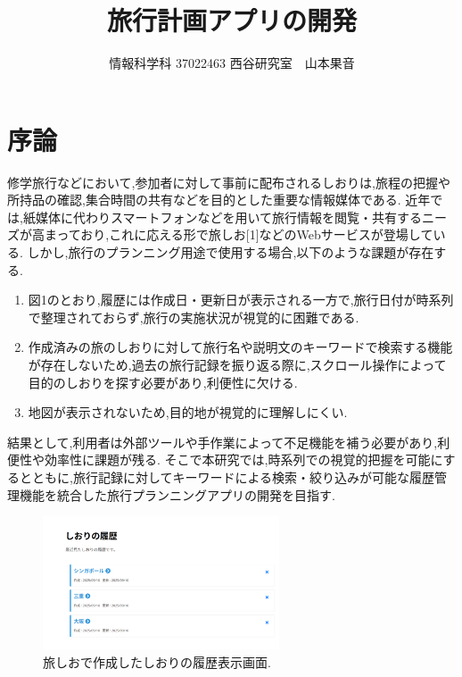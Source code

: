\documentclass[a4j,twocolumn]{jsarticle}
\begin{document}
  \title{旅行計画アプリの開発}
  \author{情報科学科 \hspace{5mm} 37022463 \hspace{5mm} 西谷研究室　山本果音}
  \date{}

  \maketitle


\section{序論}
\label{sec:org906f131}
修学旅行などにおいて,参加者に対して事前に配布されるしおりは,旅程の把握や所持品の確認,集合時間の共有などを目的とした重要な情報媒体である.
近年では,紙媒体に代わりスマートフォンなどを用いて旅行情報を閲覧・共有するニーズが高まっており,これに応える形で旅しお[1]などのWebサービスが登場している.
しかし,旅行のプランニング用途で使用する場合,以下のような課題が存在する.
\begin{enumerate}
\item 図1のとおり,履歴には作成日・更新日が表示される一方で,旅行日付が時系列で整理されておらず,旅行の実施状況が視覚的に困難である.
\item 作成済みの旅のしおりに対して旅行名や説明文のキーワードで検索する機能が存在しないため,過去の旅行記録を振り返る際に,スクロール操作によって目的のしおりを探す必要があり,利便性に欠ける.
\item 地図が表示されないため,目的地が視覚的に理解しにくい.
\end{enumerate}
結果として,利用者は外部ツールや手作業によって不足機能を補う必要があり,利便性や効率性に課題が残る.
そこで本研究では,時系列での視覚的把握を可能にするとともに,旅行記録に対してキーワードによる検索・絞り込みが可能な履歴管理機能を統合した旅行プランニングアプリの開発を目指す.


\begin{figure}[htbp]
\centering
\includegraphics[width=7cm]{./figs/rireki1.png}
\caption{\label{fig:org42f744f}旅しおで作成したしおりの履歴表示画面.}
\end{figure}
\end{document}
